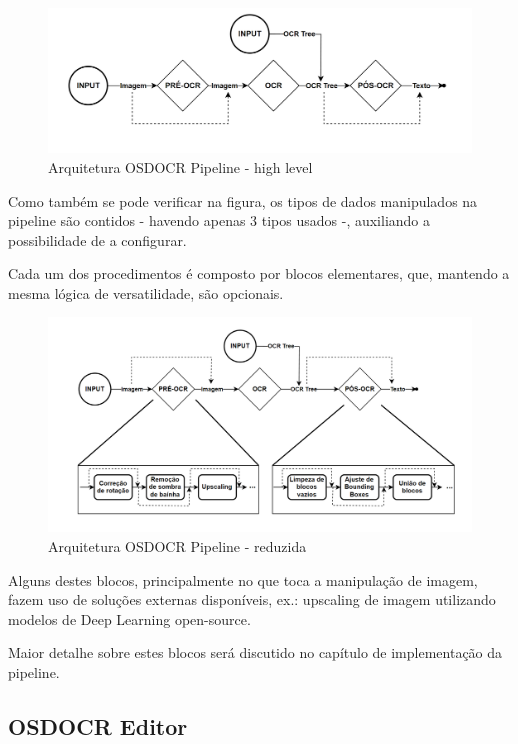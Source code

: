 \begin{figure}[H]
	\centering
	\includegraphics[width=1\textwidth]{images/diagramas/arquitetura_pipeline_high_level.png}
	\caption{Arquitetura OSDOCR Pipeline - high level}
	\label{fig:arquitetura_pipeline_high_level}
\end{figure}

Como também se pode verificar na figura, os tipos de dados manipulados na pipeline são contidos - havendo apenas 3 tipos usados -, auxiliando a possibilidade de a configurar.


Cada um dos procedimentos é composto por blocos elementares, que, mantendo a mesma lógica de versatilidade, são opcionais.


\begin{figure}[H]
	\centering
	\includegraphics[width=1\textwidth]{images/diagramas/arquitetura_pipeline_reduced.png}
	\caption{Arquitetura OSDOCR Pipeline - reduzida}
	\label{fig:arquitetura_pipeline_reduced}
\end{figure}

Alguns destes blocos, principalmente no que toca a manipulação de imagem, fazem uso de soluções externas disponíveis, ex.: upscaling de imagem utilizando modelos de Deep Learning open-source.

Maior detalhe sobre estes blocos será discutido no capítulo de implementação da pipeline.


\subsection{OSDOCR Editor}

